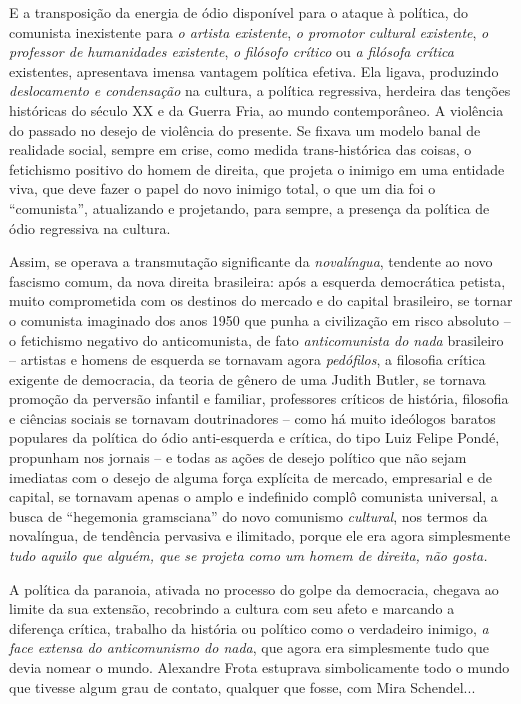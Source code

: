 E a transposição da energia de ódio disponível para o ataque à política,
do comunista inexistente para \emph{o artista existente}, \emph{o
promotor cultural existente}, \emph{o} \emph{professor de humanidades
existente}, \emph{o} \emph{filósofo crítico} ou \emph{a filósofa
crítica} existentes, apresentava imensa vantagem política efetiva. Ela
ligava, produzindo \emph{deslocamento e condensação} na cultura, a
política regressiva, herdeira das tenções históricas do século XX e da
Guerra Fria, ao mundo contemporâneo. A violência do passado no desejo de
violência do presente. Se fixava um modelo banal de realidade social,
sempre em crise, como medida trans-histórica das coisas, o fetichismo
positivo do homem de direita, que projeta o inimigo em uma entidade
viva, que deve fazer o papel do novo inimigo total, o que um dia foi o
``comunista'', atualizando e projetando, para sempre, a presença da
política de ódio regressiva na cultura.

Assim, se operava a transmutação significante da \emph{novalíngua},
tendente ao novo fascismo comum, da nova direita brasileira: após a
esquerda democrática petista, muito comprometida com os destinos do
mercado e do capital brasileiro, se tornar o comunista imaginado dos
anos 1950 que punha a civilização em risco absoluto -- o fetichismo
negativo do anticomunista, de fato \emph{anticomunista do nada}
brasileiro -- artistas e homens de esquerda se tornavam agora
\emph{pedófilos}, a filosofia crítica exigente de democracia, da teoria
de gênero de uma Judith Butler, se tornava promoção da perversão
infantil e familiar, professores críticos de história, filosofia e
ciências sociais se tornavam doutrinadores -- como há muito ideólogos
baratos populares da política do ódio anti-esquerda e crítica, do tipo
Luiz Felipe Pondé, propunham nos jornais -- e todas as ações de desejo
político que não sejam imediatas com o desejo de alguma força explícita
de mercado, empresarial e de capital, se tornavam apenas o amplo e
indefinido complô comunista universal, a busca de ``hegemonia
gramsciana'' do novo comunismo \emph{cultural}, nos termos da
novalíngua, de tendência pervasiva e ilimitado, porque ele era agora
simplesmente \emph{tudo aquilo que alguém, que se projeta como um homem
de direita, não gosta. }

A política da paranoia, ativada no processo do golpe da democracia,
chegava ao limite da sua extensão, recobrindo a cultura com seu afeto e
marcando a diferença crítica, trabalho da história ou político como o
verdadeiro inimigo, \emph{a face extensa do anticomunismo do nada}, que
agora era simplesmente tudo que devia nomear o mundo. Alexandre Frota
estuprava simbolicamente todo o mundo que tivesse algum grau de contato,
qualquer que fosse, com Mira Schendel...


